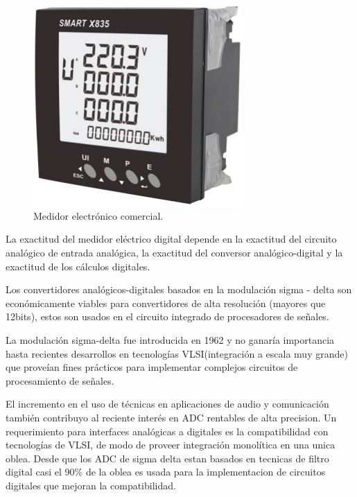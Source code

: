 \begin{figure}[h]
	\centering
	\includegraphics[width=80mm,keepaspectratio]{Figures/3931_1.png}
	\caption{Medidor electrónico comercial.}
	\label{fig:texmaker}
\end{figure}

La exactitud del medidor eléctrico digital depende en la exactitud del circuito analógico de entrada analógica, la exactitud del conversor analógico-digital y la exactitud de los cálculos digitales.\citep{Hribik2004DigitalPA}

Los convertidores analógicos-digitales basados en la modulación sigma - delta son económicamente viables para convertidores de alta resolución (mayores que 12bits), estos son  usados en el circuito integrado de procesadores de señales.

La modulación sigma-delta fue introducida en 1962 y no ganaría importancia hasta recientes desarrollos en tecnologías VLSI(integración a escala muy grande) que proveían fines prácticos para implementar complejos circuitos de procesamiento de señales.

 El incremento en el uso de técnicas en aplicaciones de audio y comunicación también contribuyo al reciente interés en ADC rentables de alta precision. Un requerimiento para interfaces analógicas a digitales es la compatibilidad con tecnologías de VLSI, de modo de proveer integración monolítica en  una unica oblea. Desde que los ADC de sigma delta estan basados en tecnicas de filtro digital casi el 90\% de la oblea es usada para la implementacion de circuitos digitales que mejoran la compatibilidad.\citep{book:28601}











